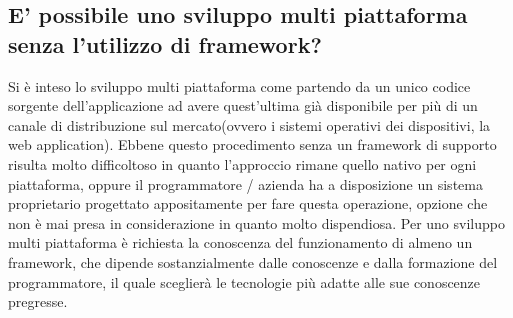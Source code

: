 \subsection{E' possibile uno sviluppo multi piattaforma senza l'utilizzo di framework?}

Si è inteso lo sviluppo multi piattaforma come partendo da un unico codice sorgente dell'applicazione ad avere quest'ultima già disponibile per più di un canale di distribuzione sul mercato(ovvero i sistemi operativi dei dispositivi, la web application). Ebbene questo procedimento senza un framework di supporto risulta molto difficoltoso in quanto l'approccio rimane quello nativo per ogni piattaforma, oppure il programmatore / azienda ha a disposizione un sistema proprietario progettato appositamente per fare questa operazione, opzione che non è mai presa in considerazione in quanto molto dispendiosa.
Per uno sviluppo multi piattaforma è richiesta la conoscenza del funzionamento di almeno un framework, che dipende sostanzialmente dalle conoscenze e dalla formazione del programmatore, il quale sceglierà le tecnologie più adatte alle sue conoscenze pregresse.
  


   







